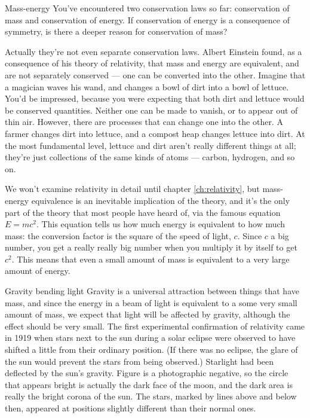 \label{sec:massenergy}
\begin{envsubsection}{Mass-energy}
You've encountered two conservation laws so far: conservation of mass and conservation
of energy. If conservation of energy is a consequence of symmetry, is there a
deeper reason for conservation of mass?

Actually they're not even separate conservation laws. Albert Einstein found,
as a consequence of his theory of relativity, that mass and energy are equivalent, and
are not separately conserved --- one can be converted into the other. Imagine that
a magician waves his wand, and changes a bowl of dirt into a bowl of lettuce. You'd be
impressed, because you were expecting that both dirt and lettuce would be conserved
quantities. Neither one can be made to vanish, or to appear out of thin air. However,
there are processes that can change one into the other. A farmer changes dirt into
lettuce, and a compost heap changes lettuce into dirt. At the most fundamental
level, lettuce and dirt aren't really different things at all; they're just collections
of the same kinds of atoms --- carbon, hydrogen, and so on.

We won't examine relativity in detail until chapter \ref{ch:relativity}, but mass-energy
equivalence is an inevitable implication of the theory, and it's the only part of the
theory that most people have heard of, via the famous equation $E=mc^2$. This equation
tells us how much energy is equivalent to how much mass: the conversion factor is the square
of the speed of light, $c$. Since $c$ a big number, you get a really really big number
when you multiply it by itself to get $c^2$. This means that even a small amount of mass
is equivalent to a very large amount of energy. 

\begin{eg}{Gravity bending light}\label{eg:eclipse}
Gravity is a universal attraction between things that have mass, and since the energy
in a beam of light is equivalent to a some very small amount of mass, we expect that
light will be affected by gravity, although the effect should be very small.
The first experimental confirmation of relativity
came in 1919 when stars next to the sun during a solar eclipse were
observed to have shifted a little from their ordinary
position. (If there was no eclipse, the glare of the sun
would prevent the stars from being observed.) Starlight had
been deflected by the sun's gravity. Figure  is a
photographic negative, so the circle that appears bright is actually the
dark face of the moon, and the dark area is really the bright corona of
the sun. The stars, marked by lines above and below then, appeared at
positions slightly different than their normal ones.
\end{eg}


\end{envsubsection}
